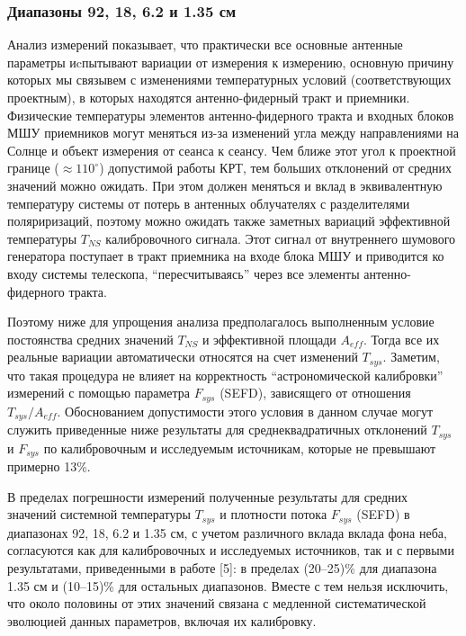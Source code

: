 \subsubsection{Диапазоны 92, 18, 6.2 и 1.35 см}

Анализ измерений показывает, что практически все основные антенные параметры иcпытывают вариации от
измерения к измерению, основную причину которых мы связывем с изменениями температурных условий
(соответствующих проектным), в которых находятся антенно-фидерный тракт и приемники. Физические
температуры элементов антенно-фидерного тракта и входных блоков МШУ приемников могут меняться из-за
изменений угла между направлениями на Солнце и объект измерения от сеанса к сеансу. Чем ближе этот
угол к проектной границе ($\approx 110^\circ$) допустимой работы КРТ, тем больших отклонений от
средних значений можно ожидать. При этом должен меняться и вклад в эквивалентную температуру системы
от потерь в антенных облучателях с разделителями поляриризаций, поэтому можно ожидать также заметных
вариаций эффективной температуры $T_{NS}$ калибровочного сигнала. Этот сигнал от внутреннего
шумового генератора поступает в тракт приемника на входе блока МШУ и приводится ко входу системы
телескопа, ``пересчитываясь'' через все элементы антенно-фидерного тракта.

Поэтому ниже для упрощения анализа предполагалось выполненным условие постоянства средних значений
$T_{NS}$ и  эффективной площади $A_{eff}$. Тогда все их реальные вариации автоматически относятся на
счет изменений $T_{sys}$. Заметим, что такая процедура не влияет на корректность ``астрономической
калибровки'' измерений с помощью параметра $F_{sys}$ (SEFD), зависящего от отношения $T_{sys} /
A_{eff}$. Обоснованием допустимости этого условия в данном случае могут служить приведенные ниже
результаты для среднеквадратичных отклонений $T_{sys}$ и $F_{sys}$ по калибровочным и исследуемым
источникам, которые не превышают примерно 13\%.

В пределах погрешности измерений полученные результаты для средних значений системной температуры
$T_{sys}$ и плотности потока $F_{sys}$ (SEFD) в диапазонах 92, 18, 6.2 и 1.35 см, с учетом
различного вклада вклада фона неба, согласуются как для калибровочных и исследуемых источников, так
и с первыми результатами, приведенными в работе [5]: в пределах (20--25)\% для диапазона 1.35 см и
(10--15)\% для остальных диапазонов. Вместе с тем нельзя исключить, что около половины от этих
значений связана с медленной систематической эволюцией данных параметров, включая их калибровку.

